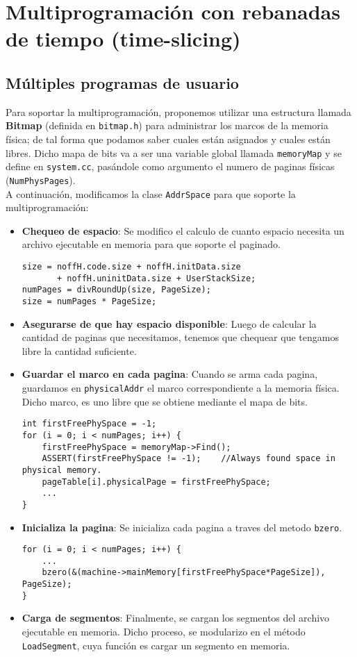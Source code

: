 \section{Multiprogramación con rebanadas de tiempo (time-slicing)}
\subsection*{Múltiples programas de usuario}
Para soportar la multiprogramación, proponemos utilizar una estructura llamada \textbf{Bitmap} (definida en \texttt{bitmap.h}) para administrar los marcos de la memoria física; de tal forma que podamos saber cuales están asignados y cuales están libres. Dicho mapa de bits va a ser una variable global llamada \texttt{memoryMap} y se define en \texttt{system.cc}, pasándole como argumento el numero de paginas físicas (\texttt{NumPhysPages}).\\
A continuación, modificamos la clase \texttt{AddrSpace} para que soporte la multiprogramación:
\begin{itemize}
    \item \textbf{Chequeo de espacio}: Se modifico el calculo de cuanto espacio necesita un archivo ejecutable en memoria para que soporte el paginado.
    \begin{lstlisting}[style=C]
size = noffH.code.size + noffH.initData.size 
       + noffH.uninitData.size + UserStackSize;
numPages = divRoundUp(size, PageSize);
size = numPages * PageSize;
    \end{lstlisting}
    \item \textbf{Asegurarse de que hay espacio disponible}: Luego de calcular la cantidad de paginas que necesitamos, tenemos que chequear que tengamos libre la cantidad suficiente.
    \item \textbf{Guardar el marco en cada pagina}: Cuando se arma cada pagina, guardamos en \texttt{physicalAddr} el marco correspondiente a la memoria física. Dicho marco, es uno libre que se obtiene mediante el mapa de bits.
    \begin{lstlisting}[style=C]
int firstFreePhySpace = -1;
for (i = 0; i < numPages; i++) {
    firstFreePhySpace = memoryMap->Find();
    ASSERT(firstFreePhySpace != -1);	//Always found space in physical memory.
    pageTable[i].physicalPage = firstFreePhySpace;
    ...
}
    \end{lstlisting}
    \item \textbf{Inicializa la pagina}: Se inicializa cada pagina a traves del metodo \texttt{bzero}.
    \begin{lstlisting}
for (i = 0; i < numPages; i++) {
    ...
    bzero(&(machine->mainMemory[firstFreePhySpace*PageSize]), PageSize);
}
    \end{lstlisting}
    \item \textbf{Carga de segmentos}: Finalmente, se cargan los segmentos del archivo ejecutable en memoria. Dicho proceso, se modularizo en el método \texttt{LoadSegment}, cuya función es cargar un segmento en memoria.
\end{itemize}
